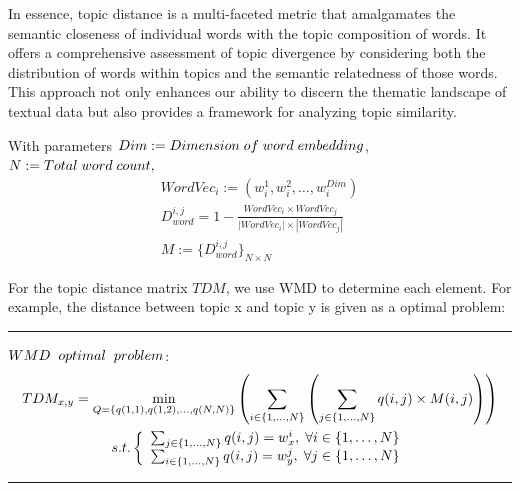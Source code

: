 \documentclass[UTF8]{ctexart}
\begin{document}
{    In essence, topic distance is a multi-faceted metric that amalgamates the semantic
    closeness of individual words with the topic composition of words. 
    It offers a comprehensive assessment of topic divergence by considering both the distribution of words within 
    topics and the semantic relatedness of those words. 
    This approach not only enhances our ability to discern the thematic landscape of textual data but also provides 
    a framework for analyzing topic similarity.

    With parameters $Dim := Dimension \hspace{0.1cm} of \hspace{0.1cm} word \hspace{0.1cm} embedding$, $N := Total \hspace{0.1cm} word \hspace{0.1cm} count,$
    \begin{gather}
        WordVec_{i} := (w_i^1, w_i^2, \dots, w_i^{Dim}) \\
        D_{word}^{i, j} = 1 - \frac{WordVec_{i} \times WordVec_{j}}{\left| WordVec_{i} \right| \times \left| WordVec_{j} \right|} \label{eq:D_word} \\
        M := \{D_{word}^{i, j}\}_{N \times N}
    \end{gather}


    For the topic distance matrix $TDM$, we use WMD to determine each element. For example, the distance between topic x and topic y is given as a optimal problem:

    \noindent \rule{\linewidth}{0.2mm}
    \noindent $WMD \hspace{0.2cm} optimal \hspace{0.2cm} problem$:
    \begin{gather}
        TDM_{x, y} = \min_{Q = \{ q(1,1), q(1,2), \dots, q(N,N) \}} \left( \sum_{i \in \{1, \dots, N\}} \left( \sum_{j \in \{1, \dots, N\}} q(i,j) \times M(i,j) \right) \right) \label{eq:TDMxy} \\
        s.t.
        \left\{
        \begin{array}{ll}
            \sum_{j \in \{1, \dots, N\}} q(i,j) = w_{x}^i, \hspace{0.1cm} \forall i \in \{1, \dots, N\} \\
            \sum_{i \in \{1, \dots, N\}} q(i,j) = w_{y}^j, \hspace{0.1cm} \forall j \in \{1, \dots, N\} 
        \end{array}
        \right. \label{eq:TDMst}
    \end{gather}
    \noindent \rule{\linewidth}{0.2mm}

}
\end{document}
